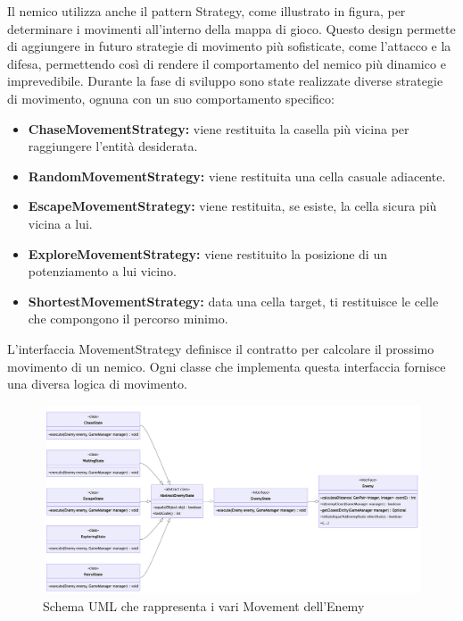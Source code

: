 \documentclass[a4paper,12pt]{report}
\begin{document}
\par
Il nemico utilizza anche il pattern Strategy, come illustrato in figura, per determinare i movimenti all’interno della mappa di gioco. Questo design permette di aggiungere in futuro strategie di movimento più sofisticate, come l’attacco e la difesa, permettendo così di rendere il comportamento del nemico più dinamico e imprevedibile. Durante la fase di sviluppo sono state realizzate diverse strategie di movimento, ognuna con un suo comportamento specifico: 
\begin{itemize}
 \item \textbf{ChaseMovementStrategy:} viene restituita la casella più vicina per raggiungere l’entità desiderata.
 \item \textbf{RandomMovementStrategy:} viene restituita una cella casuale adiacente.
 \item \textbf{EscapeMovementStrategy:} viene restituita, se esiste, la cella sicura più vicina a lui.
 \item \textbf{ExploreMovementStrategy:} viene restituito la posizione di un potenziamento a lui vicino.
 \item \textbf{ShortestMovementStrategy:} data una cella target, ti restituisce le celle che compongono il percorso minimo.
\end{itemize}

\par
L'interfaccia MovementStrategy definisce il contratto per calcolare il prossimo movimento di un nemico. Ogni classe che implementa questa interfaccia fornisce una diversa logica di movimento. 

\begin{figure}[h]
\centering{}
\includegraphics[width=\textwidth]{report-src/img/enemyState.png}
\caption{Schema UML che rappresenta i vari Movement dell'Enemy}
\end{figure}
\end{document}
